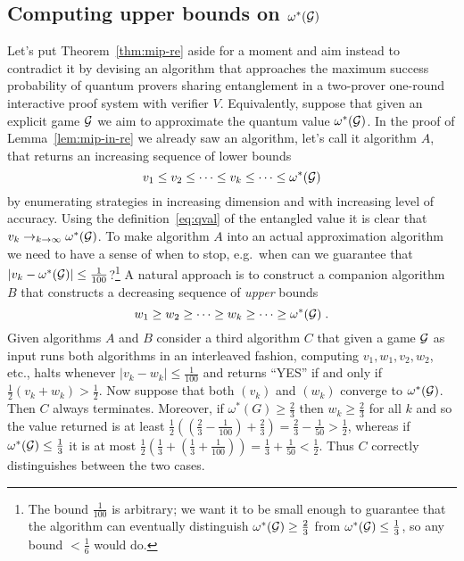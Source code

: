 \subsection{Computing upper bounds on $\omega^*(\mathcal{G})$}
\label{sec:ub-game}

Let's put Theorem~\ref{thm:mip-re} aside for a moment and aim instead to contradict it by devising an algorithm that approaches the maximum success probability of quantum provers sharing entanglement in a two-prover one-round interactive proof system with verifier $V$. Equivalently, suppose that given an explicit game $\mathcal{G}$ we aim to approximate the quantum value $\omega^*(\mathcal{G})$. In the proof of Lemma~\ref{lem:mip-in-re} we already saw an algorithm, let's call it algorithm $A$, that returns an increasing sequence of lower bounds 
\[ v_1 \leq v_2 \leq \cdots \leq v_k \leq \cdots \leq \omega^*(\mathcal{G})\]
by enumerating strategies in increasing dimension and with increasing level of accuracy. Using the definition~\eqref{eq:qval} of the entangled value it is clear that $v_k \to_{k\to\infty} \omega^*(\mathcal{G})$. To make algorithm $A$ into an actual approximation algorithm we need to have a sense of when to stop, e.g.\ when can we guarantee that $|v_k -\omega^*(\mathcal{G})|\leq \frac{1}{100}$?\footnote{The bound $\frac{1}{100}$ is arbitrary; we want it to be small enough to guarantee that the algorithm can eventually distinguish $\omega^*(\mathcal{G})\geq\frac{2}{3}$ from $\omega^*(\mathcal{G}) \leq\frac{1}{3}$, so any bound $<\frac{1}{6}$ would do.} A natural approach is to construct a companion algorithm $B$ that constructs a decreasing sequence of \emph{upper} bounds 
\[ w_1 \geq w_2 \geq \cdots \geq w_k \geq \cdots \geq \omega^*(\mathcal{G})\;.\]
Given algorithms $A$ and $B$ consider a third algorithm $C$ that given a game $\mathcal{G}$ as input runs both algorithms in an interleaved fashion, computing $v_1,w_1,v_2,w_2$, etc., halts whenever $|v_k-w_k|\leq \frac{1}{100}$ and returns ``YES'' if and only if $\frac{1}{2}(v_k+w_k) > \frac{1}{2}$. Now suppose that both $(v_k)$ and $(w_k)$ converge to $\omega^*(\mathcal{G})$. Then $C$ always terminates. Moreover, if $\omega^*(G) \geq \frac{2}{3}$ then $w_k \geq \frac{2}{3}$ for all $k$ and so the value returned is at least $\frac{1}{2}((\frac{2}{3}-\frac{1}{100})+\frac{2}{3})=\frac{2}{3}-\frac{1}{50} > \frac{1}{2}$, whereas if $\omega^*(\mathcal{G}) \leq \frac{1}{3}$ it is at most $\frac{1}{2}(\frac{1}{3}+(\frac{1}{3}+\frac{1}{100}))=\frac{1}{3}+\frac{1}{50} < \frac{1}{2}$. Thus $C$ correctly distinguishes between the two cases. 

